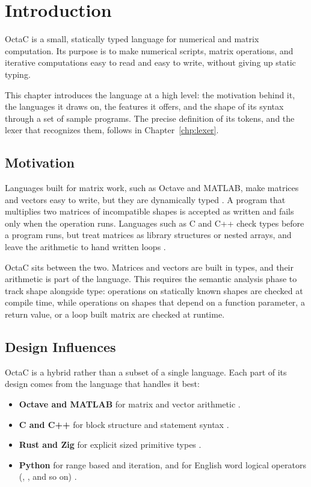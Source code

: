 
\chapter{Introduction}
\label{chp:introduction}

OctaC is a small, statically typed language for numerical and matrix
computation. Its purpose is to make numerical scripts, matrix operations,
and iterative computations easy to read and easy to write, without giving
up static typing.

This chapter introduces the language at a high level: the motivation behind
it, the languages it draws on, the features it offers, and the shape of its
syntax through a set of sample programs. The precise definition of its
tokens, and the lexer that recognizes them, follows in
Chapter~\ref{chp:lexer}.

\section{Motivation}
\label{sec:motivation}

Languages built for matrix work, such as Octave and MATLAB, make matrices
and vectors easy to write, but they are dynamically typed
\cite{octave-manual,matlab-docs}. A program that multiplies two matrices of
incompatible shapes is accepted as written and fails only when the operation
runs. Languages such as C and C++ check types before a program runs, but
treat matrices as library structures or nested arrays, and leave the
arithmetic to hand written loops \cite{kernighan1988c,stroustrup2013cpp}.

OctaC sits between the two. Matrices and vectors are built in types, and
their arithmetic is part of the language. This requires the semantic
analysis phase to track shape alongside type: operations on statically known
shapes are checked at compile time, while operations on shapes that depend
on a function parameter, a return value, or a loop built matrix are checked
at runtime.

\section{Design Influences}

OctaC is a hybrid rather than a subset of a single language. Each part of
its design comes from the language that handles it best:

\begin{itemize}
    \item \textbf{Octave and MATLAB} for matrix and vector arithmetic
    \cite{octave-manual,matlab-docs}.
    \item \textbf{C and C++} for block structure and statement syntax
    \cite{kernighan1988c,stroustrup2013cpp}.
    \item \textbf{Rust and Zig} for explicit sized primitive types
    \cite{rust-book,zig-reference}.
    \item \textbf{Python} for range based and  iteration, and
    for English word logical operators (, , and so on)
    \cite{python-reference}.
\end{itemize}

